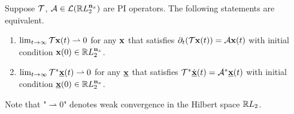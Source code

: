 \begin{theorem}\label{thm:dual stability}
    Suppose $\mathcal{T}$, $\mathcal{A} \in \mathcal{L}(\mathbb{R} L_2^{\mathbf{n}_x})$ are PI operators. The following statements are equivalent.
    \begin{enumerate}[label= \alph*)]
        \item $\lim_{t\to\infty} \mathcal{T}\mathbf{x}(t) \rightharpoonup 0$ for any $\mathbf{x}$ that satisfies $\partial_t(\mathcal{T}\mathbf{x}(t)) = \mathcal{A}\mathbf{x}(t)$ with initial condition $\mathbf{x}(0)\in \mathbb{R} L_2^{\mathbf{n}_x}$.
        \item $\lim_{t\to\infty} \mathcal{T}^*\underline{\mathbf{x}}(t) \rightharpoonup 0$ for any $\underline{\mathbf{x}}$ that satisfies $\mathcal{T}^*\dot{\underline{\mathbf{x}}}(t) = \mathcal{A}^*\underline{\mathbf{x}}(t)$ with initial condition $\underline{\mathbf{x}}(0)\in \mathbb{R} L_2^{\mathbf{n}_x}$.
    \end{enumerate}
    Note that "$\rightharpoonup 0$" denotes weak convergence in the Hilbert space $\mathbb{R} L_2$.
\end{theorem}
